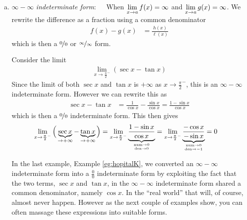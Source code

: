 \begin{enumerate}[(a)]
\begin{eg}
\end{eg}


\item $\infty-\infty$ \emph{indeterminate form}:\ \ \ When $\displaystyle \lim_{x\to a}f(x) =
\infty$ and $\displaystyle \lim_{x\to a} g(x) = \infty$. We rewrite the difference as a fraction
using a common denominator
\begin{align*}
  f(x) - g(x) &= \frac{h(x)}{\ell(x)}
\end{align*}
which is then a $\nicefrac{0}{0}$ or $\nicefrac{\infty}{\infty}$ form.
\begin{eg}\label{eg:hopitalK}
Consider the limit
\begin{align*}
\lim_{x\to \frac{\pi}{2}^-} \left( \sec x - \tan x\right)
\end{align*}
Since the limit of both $\sec x$ and $\tan x$ is $+\infty$ as $x \to
\frac{\pi}{2}^-$, this is an $\infty-\infty$ indeterminate form. However we can
rewrite this as
\begin{align*}
  \sec x - \tan x &= \frac{1}{\cos x} - \frac{\sin x}{\cos x} = \frac{1-\sin x}{\cos x}
\end{align*}
which is then a $\nicefrac00$ indeterminate form. This then gives
\begin{align*}
\lim_{x\rightarrow \frac{\pi}{2}^-}\Big(
                \underbrace{\sec x}_{\rightarrow +\infty}
                     - \underbrace{\tan x}_{\rightarrow+\infty}\Big)
& =\lim_{x\rightarrow \frac{\pi}{2}^-}\underbrace{\frac{1-\sin x}
     {\cos x}}_{\atp
        {\mathrm{num}\rightarrow 0}
        {\mathrm{den}\rightarrow 0}}
 =\lim_{x\rightarrow \frac{\pi}{2}^-}\underbrace{\frac{-\cos x}
     {-\sin x}}_{\atp
        {\mathrm{num}\rightarrow 0}
        {\mathrm{den}\rightarrow -1}}
=0
\end{align*}
\end{eg}\goodbreak
In the last example, Example \ref{eg:hopitalK}, we converted an
$\infty-\infty$ indeterminate form into a $\frac{0}{0}$ indeterminate form
by exploiting the fact that the two terms, $\sec x$ and $\tan x$,
in the $\infty-\infty$ indeterminate form shared a common denominator,
namely $\cos x$.
In the ``real world'' that will, of course, almost never happen. However as the next
couple of examples show, you can often massage these expressions into suitable forms.



\end{enumerate}
